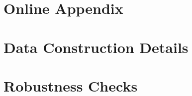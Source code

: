 \clearpage
\appendix
\setcounter{table}{0}
\renewcommand{\thetable}{A\arabic{table}}
\setcounter{figure}{0}
\renewcommand{\thefigure}{A\arabic{figure}}

\section*{Online Appendix}

\section{Data Construction Details}\label{app:data}

\section{Robustness Checks}\label{app:robustness}
